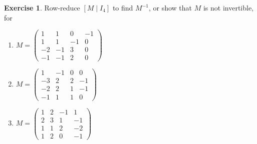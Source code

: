 \documentclass[12pt]{article}
\theoremstyle{definition}
\newtheorem{exercise}{Exercise}
\begin{document}
\begin{exercise}\label{r2-dr-inverse3}
Row-reduce \([M\mid I_4]\) to find \(M^{-1}\), or show that \(M\) is not invertible, for
\begin{enumerate}
\item \(M=\begin{pmatrix}1&1&0&-1\\1&1&-1&0\\-2&-1&3&0\\-1&-1&2&0\end{pmatrix}\)
\item \(M=\begin{pmatrix}1&-1&0&0\\-3&2&2&-1\\-2&2&1&-1\\-1&1&1&0\end{pmatrix}\)
\item \(M=\begin{pmatrix}1&2&-1&1\\2&3&1&-1\\1&1&2&-2\\1&2&0&-1\end{pmatrix}\)
\end{enumerate}
\end{exercise}
\end{document}
